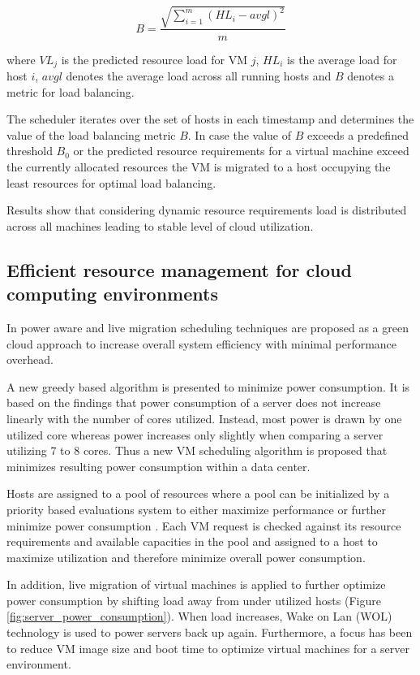 \[ B = \frac{\sqrt{\sum_{i=1}^{m}{(HL_i - avgl)^2}}}{m} \]

where $VL_j$ is the predicted resource load for VM $j$, $HL_i$ is the average load for host $i$, $avgl$ denotes the average
load across all running hosts and $B$ denotes a metric for load balancing. 

The scheduler iterates over the set of hosts in each timestamp and determines the value of the load balancing metric $B$. In case the value of 
$B$ exceeds a predefined threshold $B_0$ or the predicted resource requirements for a virtual machine exceed the currently allocated resources 
the VM is migrated to a host occupying the least resources for optimal load balancing. 

Results show that considering dynamic resource requirements load is distributed across all machines leading to stable level of cloud utilization. 



\subsection{Efficient resource management for cloud computing environments}

In \cite{younge2010efficient} power aware and live migration scheduling techniques are proposed as a green cloud approach to increase overall system efficiency with minimal performance overhead. 

A new greedy based algorithm is presented to minimize power consumption. It is based on the findings that power consumption of a server does not increase linearly with the number of cores utilized. Instead, most power is drawn by one utilized core whereas power increases only slightly when comparing a server utilizing 7 to 8 cores. Thus a new VM scheduling algorithm is proposed that minimizes resulting power consumption within a data center. 

Hosts are assigned to a pool of resources where a pool can be initialized by a priority based evaluations system to either maximize performance or further minimize power consumption \cite{younge2010efficient}. Each VM request is checked against its resource requirements and available capacities in the pool and assigned to a host to maximize utilization and therefore minimize overall power consumption. 

In addition, live migration of virtual machines is applied to further optimize power consumption by shifting load away from under utilized hosts (Figure \ref{fig:server_power_consumption}). When load increases, Wake on Lan (WOL) technology is used to power servers back up again. Furthermore, a focus has been to reduce VM image size and boot time to optimize virtual machines for a server environment. 

